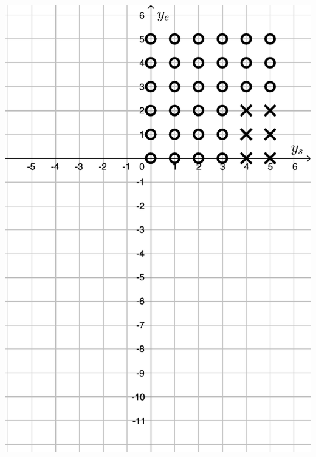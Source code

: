 \documentclass{jsarticle}
\begin{document}
\bigskip
\noindent
\hfil
\includegraphics[scale=0.5]{./fig/lpgraph4.pdf}
\hfil
\end{document}
